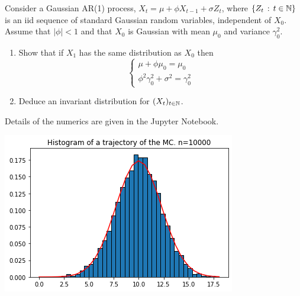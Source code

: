 \documentclass[english,graybox,envcountchap,envcountsame,sectrefs,shortlabels]{svmono}
\theoremstyle{style}
\begin{document}
%
\begin{exercise}
\label{exo:invar:one}
Consider a Gaussian AR(1) process, $X_{t}=\mu+\phi X_{t-1}+\sigma Z_{t}$,
where $\left\{ Z_{t}\,:\,t\in\mathbb{N}\right\}$ is an iid sequence of standard Gaussian
random variables, independent of $X_{0}$. Assume that $|\phi|<1$
and that $X_{0}$ is Gaussian with mean $\mu_{0}$ and variance $\gamma_{0}^{2}$.
\begin{enumerate}
\item Show that if $X_{1}$ has the same distribution as $X_{0}$ then
\[
\begin{cases}
\mu+\phi\mu_{0}=\mu_{0}\\
\phi^{2}\gamma_{0}^{2}+\sigma^{2}=\gamma_{0}^{2}
\end{cases}
\]
\item Deduce an invariant distribution for $(X_{t})_{t\in\mathbb{N}}$.
\end{enumerate}
Details of the numerics are given in the Jupyter Notebook.\begin{center}

\includegraphics[scale=0.5]{exercise2}

\end{center}
\end{exercise}
%
\end{document}
